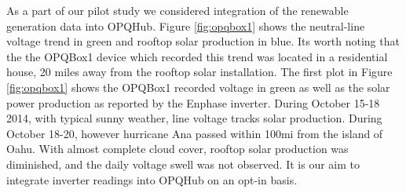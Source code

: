As a part of our pilot study we considered integration of the renewable generation data into OPQHub. Figure \ref{fig:opqbox1} shows the neutral-line voltage trend in green and rooftop solar production in blue. Its worth noting that the the OPQBox1 device which recorded this trend was located in a residential house, 20 miles away from the rooftop solar installation. The first plot in Figure \ref{fig:opqbox1} shows the OPQBox1 recorded voltage in green as well as the solar power production as reported by the Enphase\textregistered {} inverter. During October 15-18 2014, with typical sunny weather, line voltage tracks solar production. During October 18-20, however hurricane Ana passed within 100mi from the island of Oahu. With almost complete cloud cover, rooftop solar production was diminished, and the daily voltage swell was not observed. It is our aim to integrate inverter readings into OPQHub on an opt-in basis.

